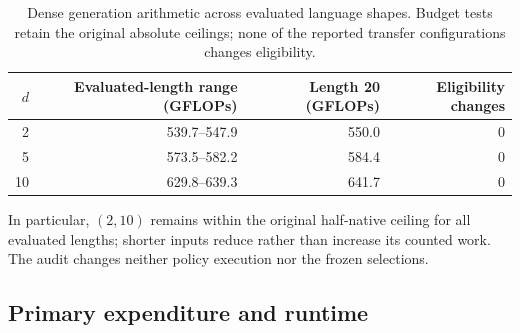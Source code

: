 \documentclass{article}
\begin{document}
\begin{table}[htbp]
\centering\small
\caption{Dense generation arithmetic across evaluated language shapes. Budget
tests retain the original absolute ceilings; none of the reported transfer
configurations changes eligibility.}
\label{tab:shape-audit}
\begin{tabular}{@{}rrrr@{}}
\toprule
$d$ & Evaluated-length range (GFLOPs) & Length 20 (GFLOPs) & Eligibility changes\\
\midrule
2  & 539.7--547.9 & 550.0 & 0\\
5  & 573.5--582.2 & 584.4 & 0\\
10 & 629.8--639.3 & 641.7 & 0\\
\bottomrule
\end{tabular}
\end{table}

In particular, $(2,10)$ remains within the original half-native ceiling for all
evaluated lengths; shorter inputs reduce rather than increase its counted work.
The audit changes neither policy execution nor the frozen selections.

\subsection{Primary expenditure and runtime}
\label{app:primary-costs}

\begin{table}[htbp]
\centering\small
\caption{Descriptive primary expenditure differences, selected minus comparator
at $h=2$, including all attempts. Intervals use the paired state bootstrap
conditional on the eight tasks and were added after outcomes were observed.
Timing intervals summarize sampling variation in the observed records; they
do not account for unmonitored runtime interference during priority completion.}
\label{tab:primary-costs}

\end{table}
\end{document}
